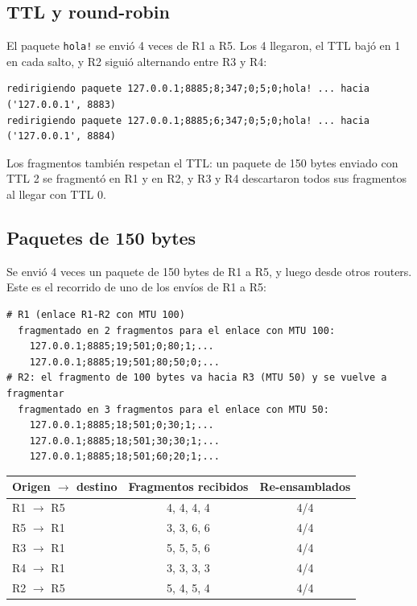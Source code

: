 \documentclass[11pt,letterpaper]{article}
\begin{document}
\subsection{TTL y round-robin}

El paquete \texttt{hola!} se envió 4 veces de R1 a R5. Los 4 llegaron, el TTL bajó en 1 en
cada salto, y R2 siguió alternando entre R3 y R4:

\begin{lstlisting}
redirigiendo paquete 127.0.0.1;8885;8;347;0;5;0;hola! ... hacia ('127.0.0.1', 8883)
redirigiendo paquete 127.0.0.1;8885;6;347;0;5;0;hola! ... hacia ('127.0.0.1', 8884)
\end{lstlisting}

Los fragmentos también respetan el TTL: un paquete de 150 bytes enviado con TTL 2 se
fragmentó en R1 y en R2, y R3 y R4 descartaron todos sus fragmentos al llegar con TTL 0.

\subsection{Paquetes de 150 bytes}

Se envió 4 veces un paquete de 150 bytes de R1 a R5, y luego desde otros routers. Este es
el recorrido de uno de los envíos de R1 a R5:

\begin{lstlisting}
# R1 (enlace R1-R2 con MTU 100)
  fragmentado en 2 fragmentos para el enlace con MTU 100:
    127.0.0.1;8885;19;501;0;80;1;...
    127.0.0.1;8885;19;501;80;50;0;...
# R2: el fragmento de 100 bytes va hacia R3 (MTU 50) y se vuelve a fragmentar
  fragmentado en 3 fragmentos para el enlace con MTU 50:
    127.0.0.1;8885;18;501;0;30;1;...
    127.0.0.1;8885;18;501;30;30;1;...
    127.0.0.1;8885;18;501;60;20;1;...
\end{lstlisting}

\begin{center}
\begin{tabular}{@{}lcc@{}}
  \toprule
  Origen $\rightarrow$ destino & Fragmentos recibidos & Re-ensamblados \\
  \midrule
  R1 $\rightarrow$ R5 & 4, 4, 4, 4 & 4/4 \\
  R5 $\rightarrow$ R1 & 3, 3, 6, 6 & 4/4 \\
  R3 $\rightarrow$ R1 & 5, 5, 5, 6 & 4/4 \\
  R4 $\rightarrow$ R1 & 3, 3, 3, 3 & 4/4 \\
  R2 $\rightarrow$ R5 & 5, 4, 5, 4 & 4/4 \\
  \bottomrule
\end{tabular}
\end{center}
\end{document}
